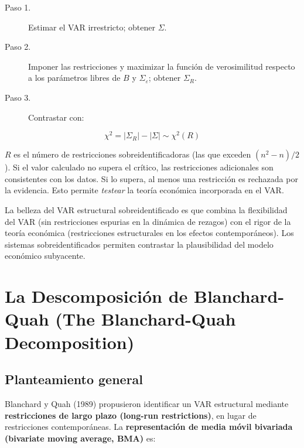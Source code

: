 \documentclass[12pt]{article}
\begin{document}
\begin{description}
  \item[Paso 1.] Estimar el VAR irrestricto; obtener $\Sigma$.
  \item[Paso 2.] Imponer las restricciones y maximizar la funci\'on de verosimilitud respecto a los par\'ametros libres de $B$ y $\Sigma_\varepsilon$; obtener $\Sigma_R$.
  \item[Paso 3.] Contrastar con:
\end{description}

\begin{equation}
\chi^2 = |\Sigma_R| - |\Sigma| \sim \chi^2(R)
\end{equation}

\begin{intuicionmat}
$R$ es el n\'umero de restricciones sobreidentificadoras (las que exceden $(n^2-n)/2$). Si el valor calculado no supera el cr\'itico, las restricciones adicionales son consistentes con los datos. Si lo supera, al menos una restricci\'on es rechazada por la evidencia. Esto permite \textit{testear} la teor\'ia econ\'omica incorporada en el VAR.
\end{intuicionmat}

\begin{intuicion}
La belleza del VAR estructural sobreidentificado es que combina la flexibilidad del VAR (sin restricciones espurias en la din\'amica de rezagos) con el rigor de la teor\'ia econ\'omica (restricciones estructurales en los efectos contempor\'aneos). Los sistemas sobreidentificados permiten contrastar la plausibilidad del modelo econ\'omico subyacente.
\end{intuicion}

\section{La Descomposici\'on de Blanchard-Quah (The Blanchard-Quah Decomposition)}

\subsection{Planteamiento general}

Blanchard y Quah (1989) propusieron identificar un VAR estructural mediante \textbf{restricciones de largo plazo (long-run restrictions)}, en lugar de restricciones contempor\'aneas. La \textbf{representaci\'on de media m\'ovil bivariada (bivariate moving average, BMA)} es:
\end{document}
